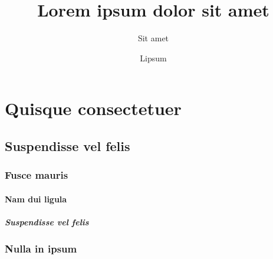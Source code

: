 \documentclass{scrreprt}
\author{Lipsum}
\title{Lorem ipsum dolor sit amet}
\subtitle{Sit amet}
\begin{document}

\maketitle

\begin{abstract}
	\lipsum[23]
\end{abstract}

\tableofcontents

\part{Quisque consectetuer}

\chapter{Suspendisse vel felis}
\lipsum[42]
\section{Fusce mauris}
\lipsum[6]
\lipsum[7]

\subsection{Nam dui ligula}
\lipsum[56]
\lipsum[57]
\lipsum[58]

\subsubsection{Suspendisse vel felis}
\lipsum[12]
\lipsum[13]

\section{Nulla in ipsum}
\lipsum[14]
\lipsum[15]
\end{document}
